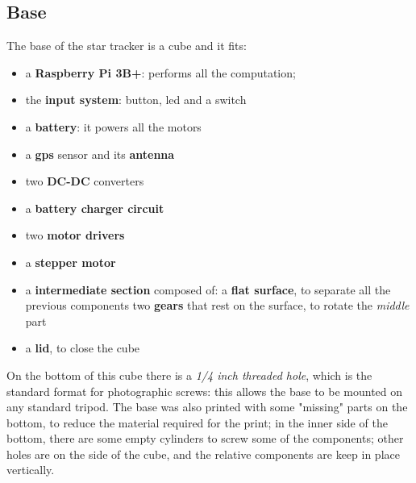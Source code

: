 \documentclass[]{article}
\begin{document}
\subsection{Base}
The base of the star tracker is a cube and it fits:
\begin{itemize}
	\item a \textbf{Raspberry Pi 3B+}: performs all the computation;
	\item the \textbf{input system}: button, led and a switch
	\item a \textbf{battery}: it powers all the motors
	\item a \textbf{gps} sensor and its \textbf{antenna}
	\item two \textbf{DC-DC} converters
	\item a \textbf{battery charger circuit}
	\item two \textbf{motor drivers}
	\item a \textbf{stepper motor}
	\item a \textbf{intermediate section} composed of: 
	\subitem{-} a \textbf{flat surface}, to separate all the previous components 
	\subitem{-} two \textbf{gears} that rest on the surface, to rotate the \textit{middle} part
	\item a \textbf{lid}, to close the cube
\end{itemize}

On the bottom of this cube there is a \textit{1/4 inch threaded hole}, which is the standard format for photographic screws: this allows the base to be mounted on any standard tripod. The base was also printed with some "missing" parts on the bottom, to reduce the material required for the print; in the inner side of the bottom, there are some empty cylinders to screw some of the components; other holes are on the side of the cube, and the relative components are keep in place vertically.
\end{document}
